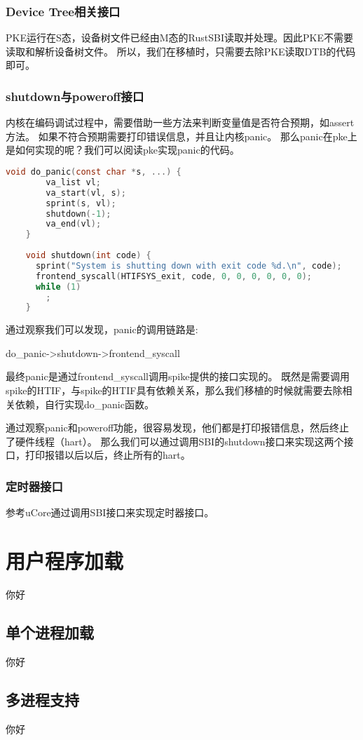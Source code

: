\subsubsection{Device Tree相关接口}

PKE运行在S态，设备树文件已经由M态的RustSBI读取并处理。因此PKE不需要读取和解析设备树文件。
所以，我们在移植时，只需要去除PKE读取DTB的代码即可。

\subsubsection{shutdown与poweroff接口}

内核在编码调试过程中，需要借助一些方法来判断变量值是否符合预期，如assert方法。
如果不符合预期需要打印错误信息，并且让内核panic。
那么panic在pke上是如何实现的呢？我们可以阅读pke实现panic的代码。

\begin{lstlisting}[language=C, caption={panic实现代码}, label={lst:panic} ]
    void do_panic(const char *s, ...) {
        va_list vl;
        va_start(vl, s);
        sprint(s, vl);
        shutdown(-1);
        va_end(vl);
    }
    
    void shutdown(int code) {
      sprint("System is shutting down with exit code %d.\n", code);
      frontend_syscall(HTIFSYS_exit, code, 0, 0, 0, 0, 0, 0);
      while (1)
        ;
    }    
\end{lstlisting}

通过观察我们可以发现，panic的调用链路是:

do\_panic->shutdown->frontend\_syscall

最终panic是通过frontend\_syscall调用spike提供的接口实现的。
既然是需要调用spike的HTIF，与spike的HTIF具有依赖关系，那么我们移植的时候就需要去除相关依赖，自行实现do\_panic函数。

通过观察panic和poweroff功能，很容易发现，他们都是打印报错信息，然后终止了硬件线程（hart）。
那么我们可以通过调用SBI的shutdown接口来实现这两个接口，打印报错以后以后，终止所有的hart。

\subsubsection{定时器接口}

参考uCore通过调用SBI接口来实现定时器接口。

\section{用户程序加载}
你好

\subsection{单个进程加载}
你好

\subsection{多进程支持}
你好